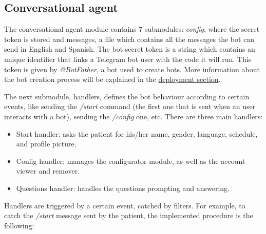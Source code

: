 \documentclass[12pt,english]{article}
\begin{document}
\subsection{Conversational agent}


The conversational agent module contains 7 submodules: \emph{config}, where the secret token is stored and messages, a file which contains all the messages the bot can send in English and Spanish. The bot secret token is a string which contains an unique identifier that links a Telegram bot user with the code it will run. This token is given by \emph{@BotFather}, a bot used to create bots. More information about the bot creation process will be explained in the \hyperref[sec:deployment]{deployment section}.

The next submodule, handlers, defines the bot behaviour according to certain events, like sending the \emph{/start} command (the first one that is sent when an user interacts with a bot), sending the {\emph{/config}} one, etc. There are three main handlers:
\begin{itemize}
  \item Start handler: asks the patient for his/her name, gender, language, schedule, and profile picture.
  \item Config handler: manages the configurator module, as well as the account viewer and remover.
  \item Questions handler: handles the questions prompting and answering.
\end{itemize}

Handlers are triggered by a certain event, catched by filters. For example, to catch the \emph{/start} message sent by the patient, the implemented procedure is the following:
\end{document}
